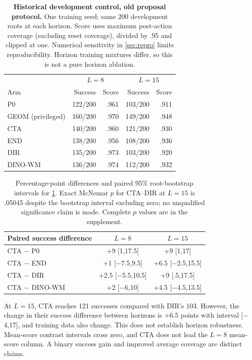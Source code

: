 \begin{table}[t]
\centering\small
\setlength{\tabcolsep}{4pt}
\begin{tabular}{lrrrr}
\toprule
& \multicolumn{2}{c}{$L=8$} & \multicolumn{2}{c}{$L=15$} \\
Arm & Success & Score & Success & Score \\
\midrule
P0 & 122/200 & .961 & 103/200 & .911 \\
GEOM (privileged) & 160/200 & .970 & 149/200 & .948 \\
CTA & 140/200 & .960 & 121/200 & .930 \\
END & 138/200 & .956 & 108/200 & .936 \\
DIR & 135/200 & .973 & 103/200 & .920 \\
DINO-WM & 136/200 & .974 & 112/200 & .932 \\
\bottomrule
\end{tabular}
\caption{\textbf{Historical development control, old proposal protocol.} One training seed; same 200 development roots at each horizon. Score uses maximum post-action coverage (excluding reset coverage), divided by .95 and clipped at one. Numerical sensitivity in \cref{sec:repro} limits reproducibility. Horizon training mixtures differ, so this is not a pure horizon ablation.}
\label{tab:closed}
\end{table}
\begin{table}[t]
\centering\small
\setlength{\tabcolsep}{3pt}
\begin{tabular}{lcc}
\toprule
Paired success difference & $L=8$ & $L=15$ \\
\midrule
CTA $-$ P0 & +9 [1,17.5] & +9 [1,17] \\
CTA $-$ END & +1 [$-$7.5,9.5] & +6.5 [$-$2.5,15.5] \\
CTA $-$ DIR & +2.5 [$-$5.5,10.5] & +9 [.5,17.5] \\
CTA $-$ DINO-WM & +2 [$-$6,10] & +4.5 [$-$4.5,13.5] \\
\bottomrule
\end{tabular}
\caption{Percentage-point differences and paired 95\% root-bootstrap intervals for \cref{tab:closed}. Exact McNemar $p$ for CTA--DIR at $L=15$ is .05045 despite the bootstrap interval excluding zero; no unqualified significance claim is made. Complete $p$ values are in the supplement.}
\label{tab:closeddiff}
\end{table}

At $L=15$, CTA reaches 121 successes compared with DIR's 103. However, the change in their success difference between horizons is +6.5 points with interval [$-$4,17], and training data also change. This does not establish horizon robustness. Mean-score contrast intervals cross zero, and CTA does not lead the $L=8$ mean-score column. A binary success gain and improved average coverage are distinct claims.

